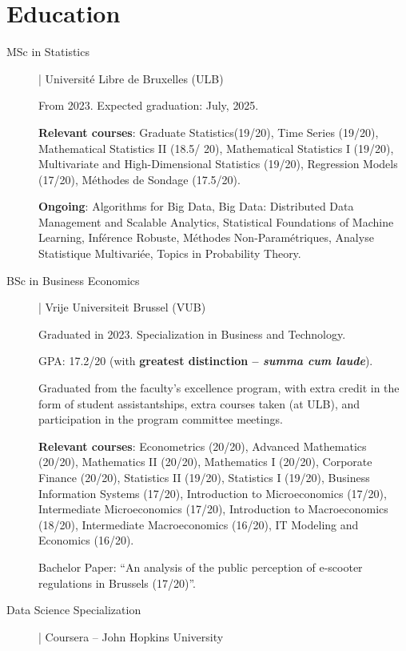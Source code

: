 \documentclass[12pt]{article}
\newcommand{\mycolor}{mySlateBlue}
\newcommand{\thesectionicon}{}
\newcommand{\sectionicon}[1]{\renewcommand{\thesectionicon}{#1}}
\begin{document}
\sectionicon{\faGraduationCap}
\section{Education}

\begin{description}

\item[\textcolor{\mycolor}{MSc in Statistics}] | Université Libre de Bruxelles (ULB)

From 2023. Expected graduation: July, 2025.

\textbf{Relevant courses}: Graduate Statistics(19/20), Time Series (19/20), Mathematical Statistics II (18.5/ 20), Mathematical Statistics I (19/20), Multivariate and High-Dimensional Statistics (19/20), Regression Models (17/20), Méthodes de Sondage (17.5/20).
  
\textbf{Ongoing}: Algorithms for Big Data, Big Data: Distributed Data Management and Scalable Analytics, Statistical Foundations of Machine Learning, Inférence Robuste, Méthodes Non-Paramétriques, Analyse Statistique Multivariée, Topics in Probability Theory.

\item[\textcolor{\mycolor}{BSc in Business Economics}] | Vrije Universiteit Brussel (VUB)

Graduated in 2023. Specialization in Business and Technology.
  
GPA: 17.2/20 (with \textbf{greatest distinction -- \emph{summa cum laude}}).

Graduated from the faculty's excellence program, with extra credit in the form of student assistantships, extra courses taken (at ULB), and participation in the program committee meetings.

\textbf{Relevant courses}: Econometrics (20/20), Advanced Mathematics (20/20), Mathematics II (20/20), Mathematics I (20/20), Corporate Finance (20/20), Statistics II (19/20), Statistics I (19/20), Business Information Systems (17/20), Introduction to Microeconomics (17/20), Intermediate Microeconomics (17/20), Introduc\-tion to Macroeconomics (18/20), Intermediate Macroeconomics (16/20), IT Modeling and Economics (16/20).

Bachelor Paper: ``An analysis of the public perception of e-scooter regulations in Brussels (17/20)''.

\item[\textcolor{\mycolor}{Data Science Specialization}] | Coursera -- John Hopkins University
  

\end{description}
\end{document}
